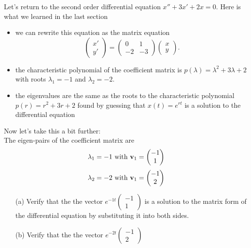 \begin{problem}
    Let's return to the second order differential equation $x'' + 3x' + 2x = 0$.  Here is
    what we learned in the last section 
    \begin{itemize}
        \item we can rewrite this equation as the matrix equation
            \[ \begin{pmatrix} x' \\ y' \end{pmatrix} = \begin{pmatrix} 0 & 1 \\ -2 & -3
            \end{pmatrix} \begin{pmatrix} x \\ y \end{pmatrix}. \]
        \item the characteristic polynomial of the coefficient matrix is $p(\lambda) =
            \lambda^2 + 3\lambda + 2$ with roots $\lambda_1 = -1$ and $\lambda_2 = -2$.  
        \item the eigenvalues are the same as the roots to the characteristic polynomial
            $p(r)= r^2 + 3r + 2$ found by guessing that $x(t) = e^{rt}$ is a solution to
            the differential equation
    \end{itemize}
    Now let's take this a bit further:\\
    The eigen-pairs of the coefficient matrix are
    \[ \lambda_1 = -1 \text{ with } {\bf v}_1 = \begin{pmatrix} -1 \\ 1 \end{pmatrix} \]
    \[ \lambda_2 = -2 \text{ with } {\bf v}_1 = \begin{pmatrix} -1 \\ 2 \end{pmatrix} \]
    \begin{enumerate}
        \item[(a)] Verify that the the vector $e^{-1 t} \begin{pmatrix} -1 \\
                1\end{pmatrix}$
            is a solution to the matrix form of the differential equation by substituting
            it into both sides.
        \item[(b)] Verify that the the vector $e^{-2 t} \begin{pmatrix} -1 \\
                2\end{pmatrix}$

\end{enumerate}
\end{problem}

